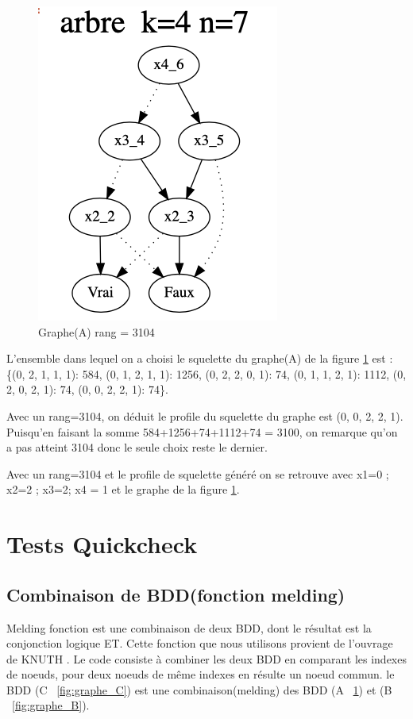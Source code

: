 \documentclass[french]{article}
\begin{document}
\begin{figure}[h!]
    \centering
    \includegraphics[scale=0.4]{arb_3104.png}
    \caption{Graphe(A) rang = 3104}
    \label{fig:graphe_A}
\end{figure}
L'ensemble dans lequel on a choisi le squelette du graphe(A) de la figure \ref{fig:graphe_A} est : \{(0, 2, 1, 1, 1): 584, (0, 1, 2, 1, 1): 1256, (0, 2, 2, 0, 1): 74, (0, 1, 1, 2, 1): 1112, (0, 2, 0, 2, 1): 74, (0, 0, 2, 2, 1): 74\}.

Avec un rang=3104, on déduit le profile du squelette du graphe est (0, 0, 2, 2, 1). Puisqu'en faisant la somme 584+1256+74+1112+74 = 3100, on remarque qu'on a pas atteint 3104 donc le seule choix reste le dernier.

Avec un rang=3104 et le profile de squelette généré on se retrouve avec {x1=0 ; x2=2  ; x3=2; x4 = 1} et le graphe de la figure \ref{fig:graphe_A}.

\section{Tests Quickcheck}

\subsection{Combinaison de BDD(fonction melding)}
Melding fonction est une combinaison de deux BDD, dont le résultat est la conjonction logique ET. Cette fonction que nous utilisons provient de l'ouvrage de KNUTH \cite{knuth}. Le code consiste à combiner les deux BDD en comparant les indexes de noeuds, pour deux noeuds de même indexes en résulte un noeud commun. le BDD 
(C ~\ref{fig:graphe_C}) est une combinaison(melding) des BDD (A ~\ref{fig:graphe_A}) et (B ~\ref{fig:graphe_B}).
\end{document}
